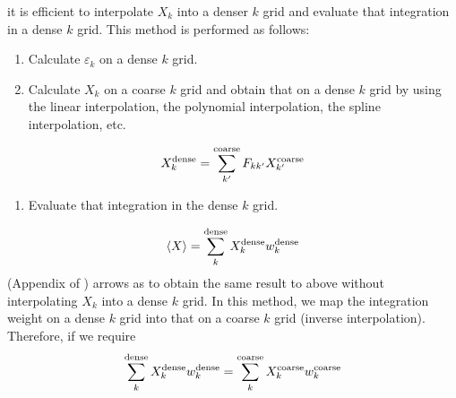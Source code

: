 \documentclass[letterpaper,10pt,pdftex,openany,english]{sphinxmanual}
\begin{document}
\sphinxAtStartPar
it is efficient to interpolate \(X_k\) into a denser \(k\) grid and
evaluate that integration in a dense \(k\) grid. This method is performed
as follows:
\begin{enumerate}
%
\item {} 
\sphinxAtStartPar
Calculate \(\varepsilon_k\) on a dense \(k\) grid.

\item {} 
\sphinxAtStartPar
Calculate \(X_k\) on a coarse \(k\) grid and obtain that on a dense \(k\)
grid by using the linear interpolation, the polynomial interpolation,
the spline interpolation, etc.

\end{enumerate}
\begin{equation*}
\begin{split}\begin{align}
X_k^{\rm dense} = \sum_{k'}^{\rm coarse}
F_{k k'} X_{k'}^{\rm coarse}
\end{align}\end{split}
\end{equation*}\begin{enumerate}
%
\item {} 
\sphinxAtStartPar
Evaluate that integration in the dense \(k\) grid.

\end{enumerate}
\begin{equation*}
\begin{split}\begin{align}
\langle X \rangle = \sum_{k}^{\rm dense}
X_k^{\rm dense} w_k^{\rm dense}
\end{align}\end{split}
\end{equation*}
\sphinxAtStartPar
{}  (Appendix of {\hyperref[\detokenize{ref:ref}]{}})
arrows as to obtain the same result
to above without interpolating \(X_k\) into a dense \(k\) grid. In this
method, we map the integration weight on a dense \(k\) grid into that on a
coarse \(k\) grid (inverse interpolation). Therefore, if we require
\begin{equation*}
\begin{split}\begin{align}
\sum_k^{\rm dense} X_k^{\rm dense} w_k^{\rm dense}
= \sum_k^{\rm coarse} X_k^{\rm coarse} w_k^{\rm coarse}
\end{align}\end{split}
\end{equation*}
\end{document}
